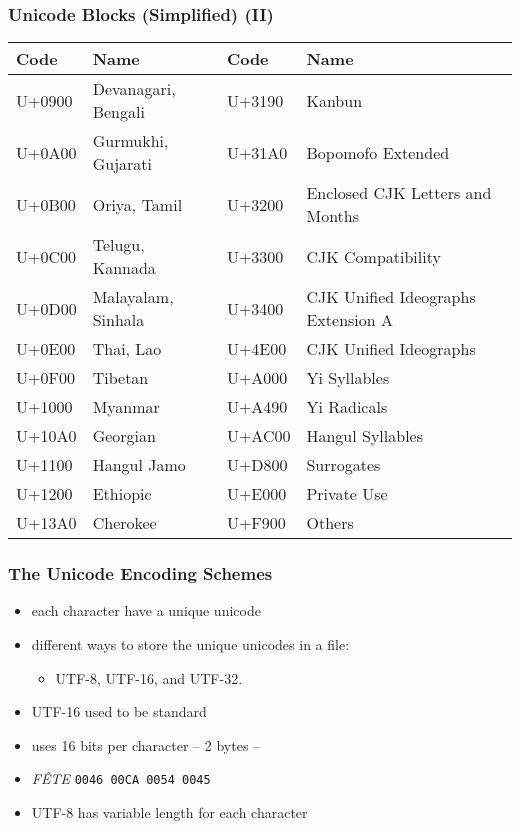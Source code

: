 \begin{frame}
\frametitle{Unicode Blocks (Simplified) (II)}
\color{structure}
\begin{footnotesize}
\begin{table}
\begin{center}
\begin{tabular}{llll}
\hline
\textbf{Code}& \textbf{Name}& \textbf{Code}& \textbf{Name} \\
\hline
U+0900& Devanagari, Bengali& U+3190& Kanbun \\
U+0A00& Gurmukhi, Gujarati& U+31A0& Bopomofo Extended \\
U+0B00& Oriya, Tamil& U+3200& Enclosed CJK Letters and Months \\
U+0C00& Telugu, Kannada& U+3300& CJK Compatibility \\
U+0D00& Malayalam, Sinhala& U+3400& CJK Unified Ideographs Extension A \\
U+0E00& Thai, Lao& U+4E00& CJK Unified Ideographs \\
U+0F00& Tibetan& U+A000& Yi Syllables \\
U+1000& Myanmar& U+A490& Yi Radicals \\
U+10A0& Georgian& U+AC00& Hangul Syllables \\
U+1100& Hangul Jamo& U+D800& Surrogates \\
U+1200& Ethiopic& U+E000& Private Use \\
U+13A0& Cherokee& U+F900& Others \\
\hline
\end{tabular}
\end{center}
\end{table}
\end{footnotesize}
\end{frame}

\begin{frame}[fragile]
\frametitle{The Unicode Encoding Schemes}
\color{structure}
\begin{itemize}
\item each character have a unique unicode
\item different ways to store the unique unicodes in a file:
  \begin{itemize}
    \item UTF-8, UTF-16, and UTF-32.\\
  \end{itemize}
\item UTF-16 used to be standard\\
\item uses 16 bits per character – 2 bytes –\\
\item \textit{FÊTE} \verb=0046 00CA 0054 0045=\\
\item UTF-8 has variable length for each character\\
\end{itemize}
\end{frame}

